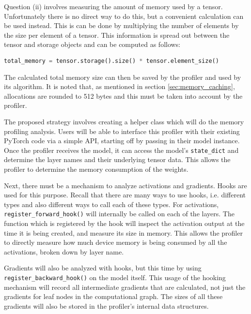 \documentclass[12pt,letterpaper]{article}
\begin{document}
Question (ii) involves measuring the amount of memory used by a tensor. Unfortunately there is no direct way to do this, but a convenient calculation can be used instead. This is can be done by multiplying the number of elements by the size per element of a tensor. This information is spread out between the tensor and storage objects and can be computed as follows:
\begin{lstlisting}[language=Python]
total_memory = tensor.storage().size() * tensor.element_size()
\end{lstlisting}
The calculated total memory size can then be saved by the profiler and used by its algorithm. It is noted that, as mentioned in section \ref{sec:memory_caching}, allocations are rounded to 512 bytes and this must be taken into account by the profiler.
\par 

The proposed strategy involves creating a helper class which will do the memory profiling analysis. Users will be able to interface this profiler with their existing PyTorch code via a simple API, starting off by passing in their model instance. Once the profiler receives the model, it can access the model's \texttt{state\_dict} and determine the layer names and their underlying tensor data. This allows the profiler to determine the memory consumption of the weights.
\par 

Next, there must be a mechanism to analyze activations and gradients. Hooks are used for this purpose. Recall that there are many ways to use hooks, i.e. different types and also different ways to call each of these types. For activations, \texttt{register\_forward\_hook()} will internally be called on each of the layers. The function which is registered by the hook will inspect the activation output at the time it is being created, and measure its size in memory. This allows the profiler to directly measure how much device memory is being consumed by all the activations, broken down by layer name.
\par 

Gradients will also be analyzed with hooks, but this time by using \texttt{register\_backward\_hook()} on the model itself. This usage of the hooking mechanism will record all intermediate gradients that are calculated, not just the gradients for leaf nodes in the computational graph. The sizes of all these gradients will also be stored in the profiler's internal data structures.
\par 
\end{document}
